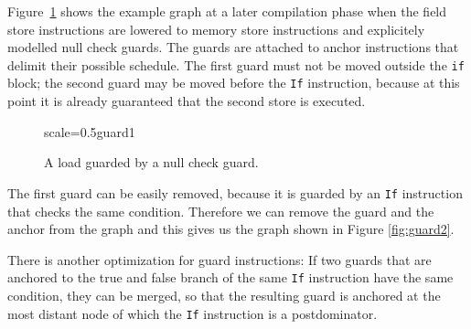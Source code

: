 \documentclass[twocolumn]{svjour3}
\begin{document}
Figure~\ref{fig:guard1} shows the example graph at a later compilation phase when the field store instructions are lowered to memory store instructions and explicitely modelled null check guards.
The guards are attached to anchor instructions that delimit their possible schedule.
The first guard must not be moved outside the \texttt{if} block; the second guard may be moved before the \texttt{If} instruction, because at this point it is already guaranteed that the second store is executed.

\begin{figure}[h]
  \centering
\begin{digraphenv}{scale=0.5}{guard1}
\end{digraphenv}
  \caption{A load guarded by a null check guard.}
  \label{fig:guard1}
\end{figure}

The first guard can be easily removed, because it is guarded by an \texttt{If} instruction that checks the same condition.
Therefore we can remove the guard and the anchor from the graph and this gives us the graph shown in Figure \ref{fig:guard2}.

There is another optimization for guard instructions: If two guards that are anchored to the true and false branch of the same \texttt{If} instruction have the same condition, they can be merged, so that the resulting guard is anchored at the most distant node of which the \texttt{If} instruction is a postdominator.
\end{document}
